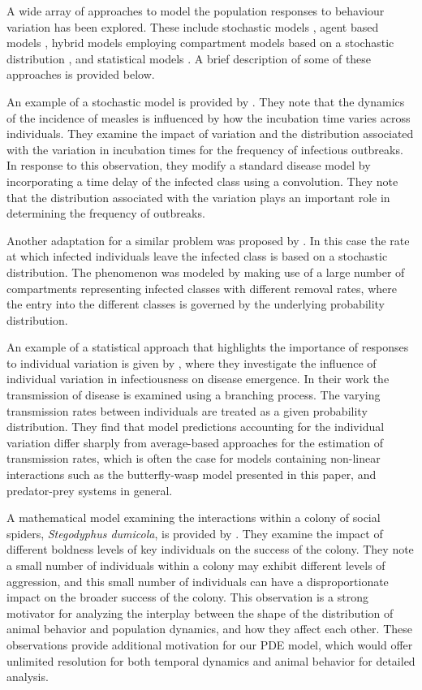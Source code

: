 \documentclass[review,authoryear]{elsarticle}
\begin{document}
A wide array of approaches to model the population responses to behaviour variation has been explored.  These include stochastic
models \citep{Keeling65}, agent based models \citep{doi:10.1086/687235},
hybrid models employing compartment models based on a stochastic
distribution \citep{doi:10.1098/rspb.2001.1599}, and statistical
models \citep{SuperspreadingLloyd}. A brief description of some of these
approaches is provided below.

An example of a stochastic model is provided by \cite{Keeling65}. They note that the dynamics of the incidence
of measles is influenced by how the incubation time varies across
individuals. 
They examine the impact of variation and the distribution associated with the variation in incubation times for the frequency of infectious outbreaks.
In response to this observation, they modify a standard
disease model by incorporating a time delay of the infected class using a convolution.  They note that the distribution associated with the variation plays an important role in determining the frequency of outbreaks.


Another adaptation for a similar problem was proposed by \cite{doi:10.1098/rspb.2001.1599}. In this case the rate at which
infected individuals leave the infected class is based on a stochastic
distribution. The phenomenon was modeled by making use of a large
number of compartments representing infected classes with different removal rates, where the entry into the different classes is
governed by the underlying probability distribution.

An example of a statistical approach that highlights the importance of
responses to individual variation is given by \cite{SuperspreadingLloyd}, where they investigate the influence of individual variation in infectiousness on disease emergence. In their work the transmission of
disease is examined using a branching process. The varying
transmission rates between individuals are treated as a given
probability distribution. They find that model predictions accounting for the individual variation differ sharply from average-based approaches for the estimation of transmission rates, which is often the case for models containing non-linear interactions such as the butterfly-wasp model presented in this paper, and predator-prey systems in general.

A mathematical model examining the interactions within a colony of
social spiders, \textit{Stegodyphus dumicola}, is provided by \cite{doi:10.1086/687235}. They  examine the impact of different boldness levels of
 key individuals on the success of the colony.  They note a small number of individuals within
a colony may exhibit different levels of aggression, and this small
number of individuals can have a disproportionate impact on the
broader success of the colony. This observation is a strong motivator for analyzing the interplay between the shape of the distribution of animal behavior and population dynamics, and how they affect each other. These observations provide additional motivation for our PDE model, which would offer unlimited resolution for both temporal dynamics and animal behavior for detailed analysis.
\end{document}
